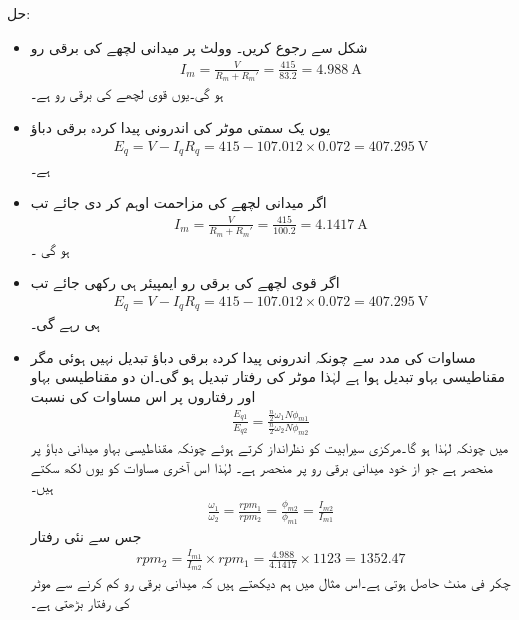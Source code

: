 حل:
\begin{itemize}
\item
شکل   سے رجوع کریں۔ وولٹ پر میدانی لچھے کی برقی رو
\begin{align*}
I_m=\tfrac{V}{R_m+R_m'}=\frac{415}{83.2}=\SI{4.988}{\ampere}
\end{align*}
ہو گی۔یوں قوی لچھے کی برقی رو  ہے۔
\item
یوں یک سمتی موٹر کی اندرونی پیدا کردہ برقی دباؤ
\begin{align*}
E_q=V-I_q R_q=415-107.012\times 0.072=\SI{407.295}{\volt}
\end{align*}
ہے۔
\item
اگر میدانی لچھے کی مزاحمت  اوہم کر دی جائے  تب
\begin{align*}
I_m=\frac{V}{R_m+R_m'}=\frac{415}{100.2}=\SI{4.1417}{\ampere}
\end{align*}
ہو گی ۔
\item
اگر قوی لچھے کی برقی رو  ایمپیئر ہی رکھی جائے تب 
\begin{align*}
E_q=V-I_q R_q=415-107.012 \times 0.072=\SI{407.295}{\volt}
\end{align*}
ہی رہے گی۔
\item
مساوات   کی مدد سے  چونکہ اندرونی پیدا کردہ برقی دباؤ تبدیل نہیں ہوئی مگر مقناطیسی بہاو تبدیل ہوا ہے لہٰذا موٹر کی رفتار تبدیل ہو گی۔ان دو مقناطیسی بہاو اور رفتاروں پر اس مساوات کی نسبت
\begin{align*}
\frac{E_{q1}}{E_{q2}}=\frac{\frac{n}{2} \omega_1 N \phi_{m1}}{\frac{n}{2} \omega_2 N \phi_{m2}}
\end{align*}
میں چونکہ  لہٰذا  ہو گا۔مرکزی سیرابیت کو نظرانداز کرتے ہوئے چونکہ مقناطیسی بہاو میدانی دباؤ پر منحصر ہے جو از خود میدانی برقی رو پر منحصر ہے۔ لہٰذا اس آخری مساوات کو یوں لکھ سکتے ہیں۔
\begin{align*}
\frac{\omega_1}{\omega_2}=\frac{rpm_1}{rpm_2}=\frac{\phi_{m2}}{\phi_{m1}}=\frac{I_{m2}}{I_{m1}}
\end{align*}
جس سے نئی رفتار
\begin{align*}
rpm_2=\frac{I_{m1}}{I_{m2}} \times rpm_1=\frac{4.988}{4.1417} \times 1123=1352.47
\end{align*}
چکر فی منٹ حاصل ہوتی ہے۔اس مثال میں ہم دیکھتے ہیں کہ میدانی برقی رو کم کرنے سے موٹر کی رفتار بڑھتی ہے۔
\end{itemize}
%
